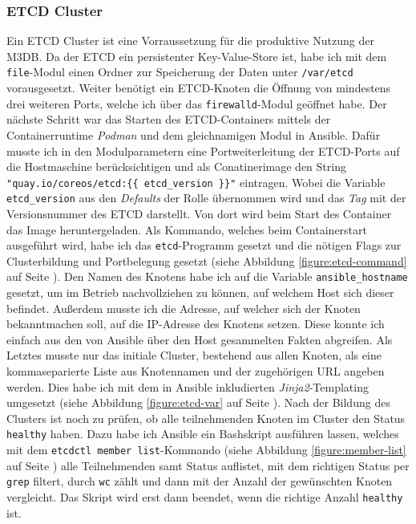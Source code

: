 \documentclass[11pt,a4paper]{article}
\begin{document}
\subsubsection{ETCD Cluster}
\label{sssec:etcd-rolle}
Ein ETCD Cluster ist eine Vorraussetzung für die produktive Nutzung der M3DB.
Da der ETCD ein persistenter Key-Value-Store ist, habe ich mit dem \verb|file|-Modul
einen Ordner zur Speicherung der Daten unter \verb|/var/etcd| vorausgesetzt. Weiter
benötigt ein ETCD-Knoten die Öffnung von mindestens drei weiteren Ports, welche ich
über das \verb|firewalld|-Modul geöffnet habe.
Der nächste Schritt war das Starten des ETCD-Containers mittels der Containerruntime
\emph{Podman} und dem gleichnamigen Modul in Ansible.
Dafür musste ich in den Modulparametern eine Portweiterleitung der ETCD-Ports auf die
Hostmaschine berücksichtigen und als  Conatinerimage den String
\verb|"quay.io/coreos/etcd:{{ etcd_version }}"| eintragen. Wobei die Variable \verb|etcd_version|
aus den \emph{Defaults} der Rolle übernommen wird und das \emph{Tag} mit der Versionsnummer
des ETCD darstellt. Von dort wird beim Start des Container das Image heruntergeladen.
Als Kommando, welches beim Containerstart ausgeführt wird, habe ich das \verb|etcd|-Programm
gesetzt und die nötigen Flags zur Clusterbildung und Portbelegung gesetzt \cite{etcd-config} (siehe Abbildung \ref{figure:etcd-command} auf Seite \pageref{figure:etcd-command}).
Den Namen des Knotens habe ich auf die Variable \verb|ansible_hostname| gesetzt, um
im Betrieb nachvollziehen zu können, auf welchem Host sich dieser befindet.
Außerdem musste ich die Adresse, auf welcher sich der Knoten bekanntmachen soll,
auf die IP-Adresse des Knotens setzen. Diese konnte ich einfach aus den von Ansible
über den Host gesammelten Fakten abgreifen. Als Letztes musste nur das initiale Cluster,
bestehend aus allen Knoten, als eine kommaseparierte Liste aus Knotennamen und der zugehörigen
URL angeben werden. Dies habe ich mit dem in Ansible inkludierten \emph{Jinja2}-Templating umgesetzt (siehe Abbildung \ref{figure:etcd-var} auf Seite \pageref{figure:etcd-var}).
Nach der Bildung des Clusters ist noch zu prüfen, ob alle teilnehmenden Knoten
im Cluster den Status \verb|healthy| haben. Dazu habe ich Ansible ein Bashskript ausführen lassen,
welches mit dem \verb|etcdctl member list|-Kommando (siehe Abbildung \ref{figure:member-list} auf Seite \pageref{figure:member-list})
alle Teilnehmenden samt Status auflistet,
mit dem richtigen Status per \verb|grep| filtert, durch \verb|wc| zählt und dann mit der Anzahl der
gewünschten Knoten vergleicht. Das Skript wird erst dann beendet, wenn die richtige Anzahl \verb|healthy| ist.
\end{document}
